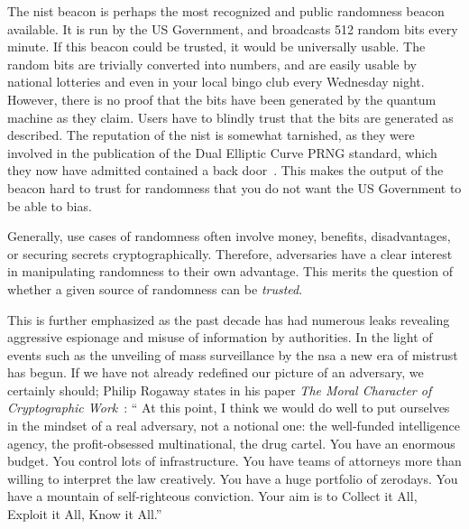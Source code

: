 The \gls{nist} beacon is perhaps the most recognized and public randomness beacon available.
It is run by the US Government, and broadcasts 512 random bits every minute.
If this beacon could be trusted, it would be universally usable. The random bits are trivially converted into numbers, and are easily usable by national lotteries and even in your local bingo club every Wednesday night.
However, there is no proof that the bits have been generated by the quantum machine as they claim. Users have to blindly trust that the bits are generated as described.
The reputation of the \gls{nist} is somewhat tarnished, as they were involved in the publication of the Dual Elliptic Curve PRNG standard, which they now have admitted contained a back door~\cite{nist2014backdoor}. This makes the output of the beacon hard to trust for randomness that you do not want the US Government to be able to bias.


Generally, use cases of randomness often involve money, benefits, disadvantages, or securing secrets cryptographically. Therefore, adversaries have a clear interest in manipulating randomness to their own advantage.
This merits the question of whether a given source of randomness can be \emph{trusted}.

This is further emphasized as the past decade has had numerous leaks revealing aggressive espionage and misuse of information by authorities.
In the light of events such as the unveiling of mass surveillance by the \gls{nsa} a new era of mistrust has begun.
If we have not already redefined our picture of an adversary, we certainly should;
Philip Rogaway states in his paper \textit{The Moral Character of Cryptographic Work}~\cite{rogaway2015moral}:
\enquote{%
    At this point, I think we would do well to put ourselves in the mindset of a real adversary, not a notional one:
    the well-funded intelligence agency, the profit-obsessed multinational, the drug cartel.
    You have an enormous budget. You control lots of infrastructure.
    You have teams of attorneys more than willing to interpret the law creatively.
    You have a huge portfolio of zerodays. You have a mountain of self-righteous conviction.
    Your aim is to Collect it All, Exploit it All, Know it All.}%

